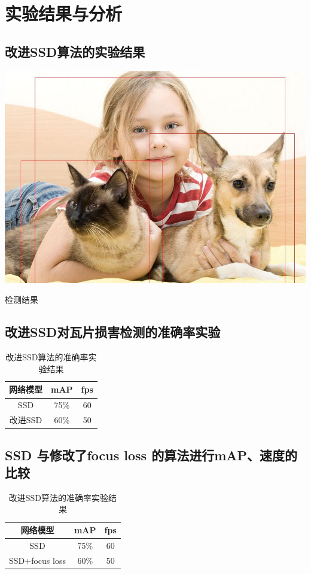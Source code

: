 \section{实验结果与分析}
\setcounter{figure}{0}

\subsection{改进SSD算法的实验结果}
\begin{uscfigure}
	\includegraphics[width=\textwidth]{./Pictures/test.jpg}	
	\caption{检测结果}
	\label{result}
\end{uscfigure}
\subsection{改进SSD对瓦片损害检测的准确率实验}
\begin{table}[htbp]
	\centering
	\caption{改进SSD算法的准确率实验结果}
	\label{}
	\begin{tabular}{ccc}
		\toprule
		网络模型 & mAP & fps\\
		\midrule
		SSD 	& 75\% & 60\\
		改进SSD  &  60\% & 50\\
		\bottomrule
	\end{tabular}
\end{table}
\subsection{SSD 与修改了focus loss 的算法进行mAP、速度的比较}
\begin{table}[htbp]
	\centering
	\caption{改进SSD算法的准确率实验结果}
	\label{}
	\begin{tabular}{ccc}
		\toprule
		网络模型 & mAP & fps\\
		\midrule
		SSD 	& 75\% & 60\\
		SSD+focus loss  &  60\% & 50\\
		\bottomrule
	\end{tabular}
\end{table}

